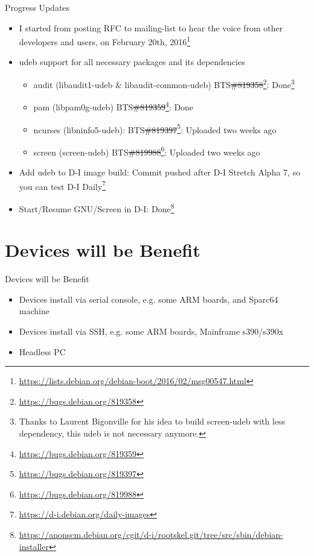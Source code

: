 \documentclass{beamer}				%
\begin{document}
\begin{frame}{Progress Updates}
  \begin{itemize}
  \item I started from posting RFC to mailing-list to hear the voice from other developers and users, on February 20th, 2016\footnote{\tiny\url{https://lists.debian.org/debian-boot/2016/02/msg00547.html}}
  \item udeb support for all necessary packages and its dependencies
    \begin{itemize}
    \item audit (libaudit1-udeb \& libaudit-common-udeb) BTS\sout{\#819358}\footnote{\tiny\url{https://bugs.debian.org/819358}}: \alert{Done}\footnote{\tiny Thanks to Laurent Bigonville for his idea to build screen-udeb with less dependency, this udeb is not necessary anymore.}
	\item pam (libpam0g-udeb) BTS\sout{\#819359}\footnote{\tiny\url{https://bugs.debian.org/819359}}: \alert{Done}\footnotemark[2]
	\item ncurses (libninfo5-udeb): BTS\sout{\#819397}\footnote{\tiny\url{https://bugs.debian.org/819397}}: \alert{Uploaded} two weeks ago
	\item screen (screen-udeb) BTS\sout{\#819988}\footnote{\tiny\url{https://bugs.debian.org/819988}}: \alert{Uploaded} two weeks ago
    \end{itemize}
  \item Add udeb to D-I image build: \alert{Commit pushed} after D-I Stretch Alpha 7, so you can test D-I Daily\footnote{\tiny\url{https://d-i.debian.org/daily-images}}
  \item Start/Resume GNU/Screen in D-I: \alert{Done}\footnote{\tiny\url{https://anonscm.debian.org/cgit/d-i/rootskel.git/tree/src/sbin/debian-installer}}
  \end{itemize}
\end{frame}


\section{Devices will be Benefit}
\begin{frame}{Devices will be Benefit}
  \begin{itemize}
  \item Devices install via serial console, e.g. some ARM boards, and Sparc64 machine
  \item Devices install via SSH, e.g. some ARM boards, Mainframe s390/s390x
  \item Headless PC
  \end{itemize}
\end{frame}
\end{document}

